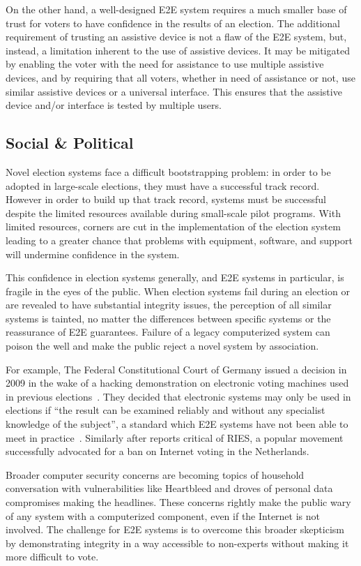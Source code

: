 On the other hand, a well-designed E2E system requires a much smaller
base of trust for voters to have confidence in the results of an
election. The additional requirement of trusting an assistive device is not a flaw of the E2E system, but, instead, a limitation inherent to the use of assistive devices. It may be mitigated by enabling the voter with the need for assistance to use multiple assistive devices, and by requiring that all voters, whether in need of assistance or not, use similar assistive devices or a universal interface. This ensures that the assistive device and/or interface is tested by multiple users. 

\subsection{Social \& Political}

Novel election systems face a difficult bootstrapping problem: in
order to be adopted in large-scale elections, they must have a
successful track record. However in order to build up that track
record, systems must be successful despite the limited resources
available during small-scale pilot programs. With limited resources,
corners are cut in the implementation of the election system leading
to a greater chance that problems with equipment, software, and
support will undermine confidence in the system.

This confidence in election systems generally, and E2E systems in
particular, is fragile in the eyes of the public. When election
systems fail during an election or are revealed to have substantial
integrity issues, the perception of all similar systems is tainted, no
matter the differences between specific systems or the reassurance of
E2E guarantees. Failure of a legacy computerized system can poison the
well and make the public reject a novel system by association.

For example, The Federal Constitutional Court of Germany issued a
decision in 2009 in the wake of a hacking demonstration on electronic
voting machines used in previous elections~\cite{germany2009decision}.
They decided that electronic systems may only be used in elections if
``the result can be examined reliably and without any specialist
knowledge of the subject'', a standard which E2E systems have not been
able to meet in practice~\cite{byrne2007usability}. Similarly after
reports critical of RIES, a popular movement successfully advocated
for a ban on Internet voting in the Netherlands.

Broader computer security concerns are becoming topics of household
conversation with vulnerabilities like Heartbleed and droves of
personal data compromises making the headlines. These concerns rightly
make the public wary of any system with a computerized component, even
if the Internet is not involved. The challenge for E2E systems is to
overcome this broader skepticism by demonstrating integrity in a way
accessible to non-experts without making it more difficult to vote.

